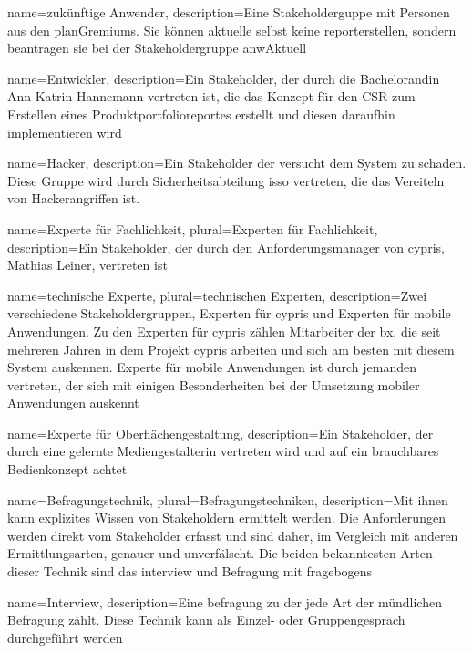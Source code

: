  {
	name=zuk\"unftige Anwender,
	description={Eine Stakeholderguppe mit Personen aus den \glspl{planGremium}. Sie k\"onnen aktuelle selbst keine \gls{report}erstellen, sondern beantragen sie bei der Stakeholdergruppe \glqq\gls{anwAktuell}\grqq}}

 {
	name=Entwickler,
	description={Ein Stakeholder, der durch die Bachelorandin Ann-Katrin Hannemann vertreten ist, die das Konzept f\"ur den CSR zum Erstellen eines Produktportfolioreportes erstellt und diesen daraufhin implementieren wird}}	

 {
	name=Hacker,
	description={Ein Stakeholder der versucht dem System zu schaden. Diese Gruppe wird durch Sicherheitsabteilung \gls{isso} vertreten, die das Vereiteln von Hackerangriffen ist.}}	
	
 {
	name=Experte f\"ur Fachlichkeit,
	plural=Experten f\"ur Fachlichkeit,
	description={Ein Stakeholder, der durch den Anforderungsmanager von \gls{cypris}, Mathias Leiner, vertreten ist}}	

 {
	name=technische Experte,
	plural=technischen Experten,
	description={Zwei verschiedene Stakeholdergruppen, Experten f\"ur \gls{cypris} und Experten f\"ur mobile Anwendungen. Zu den Experten f\"ur \gls{cypris} z\"ahlen Mitarbeiter der \gls{bx}, die seit mehreren Jahren in dem Projekt \gls{cypris} arbeiten und sich am besten mit diesem System auskennen. Experte f\"ur mobile Anwendungen ist durch jemanden vertreten, der sich mit einigen Besonderheiten bei der Umsetzung mobiler Anwendungen auskennt}}	

 {
	name=Experte f\"ur Oberfl\"achengestaltung,
	description={Ein Stakeholder, der durch eine gelernte Mediengestalterin vertreten wird und auf ein brauchbares Bedienkonzept achtet}}	
	
 {
	name=Befragungstechnik,
	plural=Befragungstechniken,
	description={Mit ihnen kann explizites Wissen von Stakeholdern ermittelt werden. Die Anforderungen werden direkt vom Stakeholder erfasst und sind daher, im Vergleich mit anderen Ermittlungsarten, genauer und unverf\"alscht. Die beiden bekanntesten Arten dieser Technik sind das \gls{interview} und Befragung mit \glspl{fragebogen}}}
	
 {
	name=Interview,
	description={Eine \gls{befragung} zu der jede Art der m\"undlichen Befragung z\"ahlt. Diese Technik kann als Einzel- oder Gruppengespr\"ach durchgef\"uhrt werden}}
		
